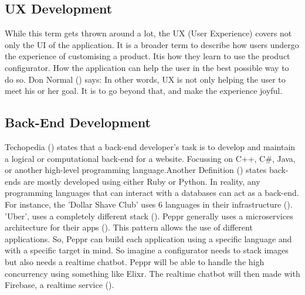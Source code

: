 \subsection{UX Development}
While this term gets thrown around a lot, the UX (User Experience) covers not only the UI of the application. It is a broader term to describe how users undergo the experience of customising a product. Itis how they learn to use the product configurator. How the application can help the user in the best possible way to do so. Don Normal (\cite{User Experience}) says: \newline
{} \newline
In other words, UX is not only helping the user to meet his or her goal. It is to go beyond that, and make the experience joyful.

\subsection{Back-End Development}
Techopedia (\cite{Back-End Developer Definition}) states that a back-end developer's task is to develop and maintain a logical or computational back-end for a website. Focussing on C++, C\#, Java, or another high-level programming language.Another Definition (\cite{Back-End Developer Definition 02}) states back-ends are mostly developed using either Ruby or Python.
In reality, any programming languages that can interact with a databases can act as a back-end. For instance, the 'Dollar Shave Club' uses 6 languages in their infrastructure (\cite{Dollar Shave Club back-end}). 'Uber', uses a completely different stack (\cite{Uber back-end}).
Peppr generally uses a microservices architecture for their apps (\cite{Microservices}). This pattern allows the use of different applications. So, Peppr can build each application using a specific language and with a specific target in mind. So imagine a configurator needs to stack images but also needs a realtime chatbot. Peppr will be able to handle the high concurrency using something like Elixr. The realtime chatbot will then made with Firebase, a realtime service (\cite{Firebase}).

